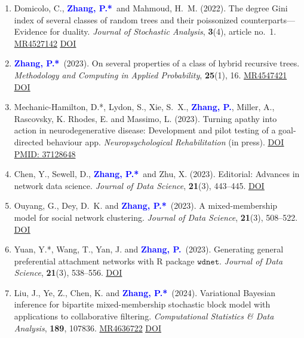 \documentclass[12pt]{article}
\def\MR#1{\href{http://www.ams.org/mathscinet-getitem?mr=#1}{MR#1}}
\def\DOI#1{\href{http://doi.org/#1}{\underline{DOI}}}
\def\PMID#1{\href{https://pubmed.ncbi.nlm.nih.gov/#1}
{PMID: #1}}
\newcommand{\PZ}{\textcolor{blue}{\textbf{Zhang, P.*}}}
\newcommand{\PZnot}{\textcolor{blue}{\textbf{Zhang, P.}}}
\begin{document}
\begin{enumerate}
		\item {\sc Domicolo, C.,} \PZ\ and Mahmoud, H.\ M. (2022). 
		The degree Gini index of several classes of random trees and 
		their poissonized counterparts---Evidence for duality. {\em 
		Journal of Stochastic Analysis}, {\bf 3}(4), article no.\ 
		1. \MR{4527142}
		\href{https://doi.org/10.31390/josa.3.4.01}{\underline{DOI}}
						
		\item \PZ\ (2023). On several properties of a class of 
		hybrid recursive trees. {\em Methodology and Computing in 
		Applied Probability}, {\bf 25}(1), 16. \MR{4547421} 
		\href{https://doi.org/10.1007/s11009-023-09988-z}{\underline{DOI}}
	
		\item {\sc Mechanic-Hamilton, D.*, Lydon, S., Xie, S.\ X.,} 
		\PZnot, {\sc Miller, A., Rascovsky, K. Rhodes, E.} and {\sc 
		Massimo, L.} (2023). Turning apathy into action in 
		neurodegenerative disease: Development and pilot testing of 
		a goal-directed behaviour app. {\em Neuropsychological 
		Rehabilitation} (in press). 
		\DOI{10.1080/09602011.2023.2203403} \PMID{37128648}
		
		\item {\sc Chen, Y., Sewell, D.,} \PZ\ and Zhu, X. (2023). 
		Editorial: Advances in network data science. {\em Journal of 
		Data Science}, {\bf 21}(3), 443--445.
		\href{https://doi.org/10.6339/23-JDS213EDI}{\underline{DOI}}
		
		\item {\sc Ouyang, G., Dey, D.\ K.} and \PZ\ (2023). 
		A mixed-membership model for social network clustering. {\em 
		Journal of Data Science}, {\bf 21}(3), 508--522.
		\href{https://doi.org/10.6339/23-JDS1109}{\underline{DOI}}
		
		\item {\sc Yuan, Y.*, Wang, T., Yan, J.} and \PZnot\ (2023). 
		Generating general preferential attachment networks with R 
		package $\mathtt{wdnet}$. {\em Journal of Data Science}, 
		{\bf 21}(3), 538--556.
		\href{https://doi.org/10.6339/23-JDS1110}{\underline{DOI}}
		
		\item {\sc Liu, J., Ye, Z., Chen, K.} and \PZ\ (2024). 
		Variational Bayesian inference for bipartite 
		mixed-membership stochastic block model with applications to 
		collaborative filtering. {\em Computational Statistics \& 
		Data Analysis}, {\bf 189}, 107836. \MR{4636722} 
		\DOI{10.1016/j.csda.2023.107836}
\end{enumerate} 
	
\end{document}
